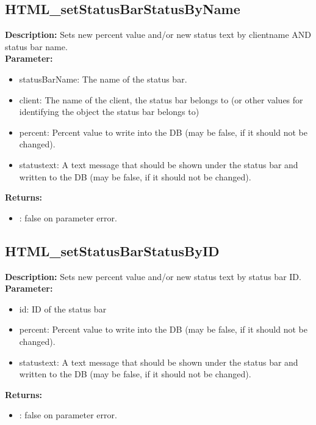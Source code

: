 \subsection{HTML\_setStatusBarStatusByName}
\textbf{Description:} Sets new percent value and/or new status text by clientname AND status bar name.\\
\textbf{Parameter:}
\begin{itemize}
\item statusBarName: The name of the status bar.
\item client: The name of the client, the status bar belongs to (or other values for identifying the object the status bar belongs to)
\item percent: Percent value to write into the DB (may be false, if it should not be changed).
\item statustext: A text message that should be shown under the status bar and written to the DB (may be false, if it should not be changed).
\end{itemize}
\textbf{Returns:}
\begin{itemize}
\item : false on parameter error.
\end{itemize}

\subsection{HTML\_setStatusBarStatusByID}
\textbf{Description:} Sets new percent value and/or new status text by status bar ID.\\
\textbf{Parameter:}
\begin{itemize}
\item id: ID of the status bar
\item percent: Percent value to write into the DB (may be false, if it should not be changed).
\item statustext: A text message that should be shown under the status bar and written to the DB (may be false, if it should not be changed).
\end{itemize}
\textbf{Returns:}
\begin{itemize}
\item : false on parameter error.
\end{itemize}


